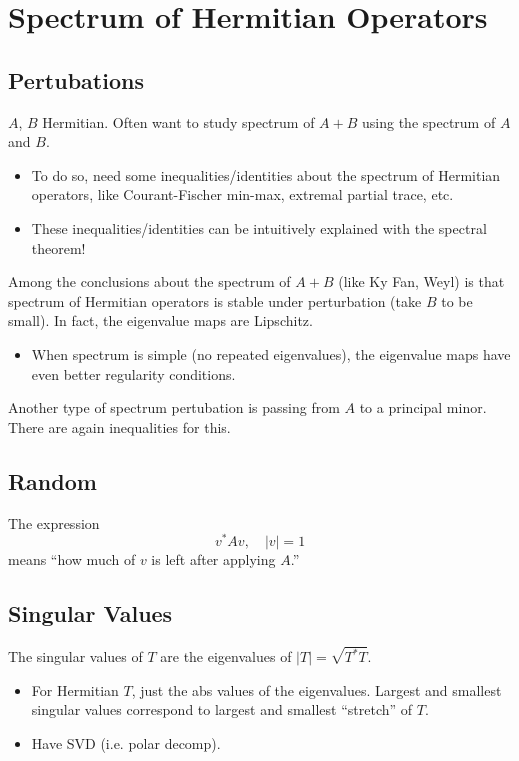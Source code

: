 \section*{Spectrum of Hermitian Operators}

\subsection*{Pertubations}
$A$, $B$ Hermitian. Often want to study spectrum of $A + B$ using the spectrum of $A$ and $B$.
\begin{itemize}
    \item To do so, need some inequalities/identities about the spectrum of Hermitian operators, like Courant-Fischer min-max, extremal partial trace, etc.
    \item These inequalities/identities can be intuitively explained with the spectral theorem!
\end{itemize}
Among the conclusions about the spectrum of $A + B$ (like Ky Fan, Weyl) is that spectrum of Hermitian operators is stable under perturbation (take $B$ to be small). In fact, the eigenvalue maps are Lipschitz.
\begin{itemize}
    \item When spectrum is simple (no repeated eigenvalues), the eigenvalue maps have even better regularity conditions.
\end{itemize}

Another type of spectrum pertubation is passing from $A$ to a principal minor. There are again inequalities for this.

\subsection*{Random}
The expression
\[
    v^*Av, \quad |v| = 1
\]
means ``how much of $v$ is left after applying $A$.''

\subsection*{Singular Values}
The singular values of $T$ are the eigenvalues of $|T| = \sqrt{T^*T}$.
\begin{itemize}
    \item For Hermitian $T$, just the abs values of the eigenvalues. Largest and smallest singular values correspond to largest and smallest ``stretch'' of $T$.
    \item Have SVD (i.e. polar decomp).
\end{itemize}